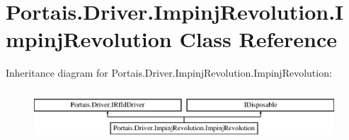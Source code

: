 \hypertarget{class_portais_1_1_driver_1_1_impinj_revolution_1_1_impinj_revolution}{}\section{Portais.\+Driver.\+Impinj\+Revolution.\+Impinj\+Revolution Class Reference}
\label{class_portais_1_1_driver_1_1_impinj_revolution_1_1_impinj_revolution}
Inheritance diagram for Portais.\+Driver.\+Impinj\+Revolution.\+Impinj\+Revolution\+:\begin{figure}[H]
\begin{center}
\leavevmode
\includegraphics[height=1.937716cm]{class_portais_1_1_driver_1_1_impinj_revolution_1_1_impinj_revolution}
\end{center}
\end{figure}
